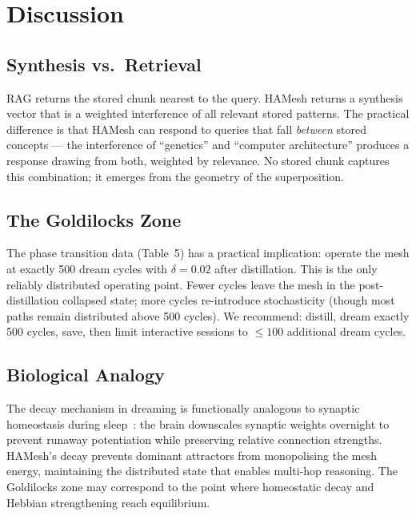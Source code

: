 \documentclass[11pt]{article}
\begin{document}
\section{Discussion}

\subsection{Synthesis vs.\ Retrieval}

RAG returns the stored chunk nearest to the query. HAMesh returns a synthesis
vector that is a weighted interference of all relevant stored patterns. The
practical difference is that HAMesh can respond to queries that fall
\emph{between} stored concepts --- the interference of ``genetics'' and
``computer architecture'' produces a response drawing from both, weighted by
relevance. No stored chunk captures this combination; it emerges from the
geometry of the superposition.

\subsection{The Goldilocks Zone}

The phase transition data (Table~5) has a practical implication: operate the
mesh at exactly 500 dream cycles with $\delta=0.02$ after distillation. This is
the only reliably distributed operating point. Fewer cycles leave the mesh in
the post-distillation collapsed state; more cycles re-introduce stochasticity
(though most paths remain distributed above 500 cycles). We recommend: distill,
dream exactly 500 cycles, save, then limit interactive sessions to $\le 100$
additional dream cycles.

\subsection{Biological Analogy}

The decay mechanism in dreaming is functionally analogous to synaptic
homeostasis during sleep~\cite{tononi2014}: the brain downscales synaptic
weights overnight to prevent runaway potentiation while preserving relative
connection strengths. HAMesh's decay prevents dominant attractors from
monopolising the mesh energy, maintaining the distributed state that enables
multi-hop reasoning. The Goldilocks zone may correspond to the point where
homeostatic decay and Hebbian strengthening reach equilibrium.
\end{document}
